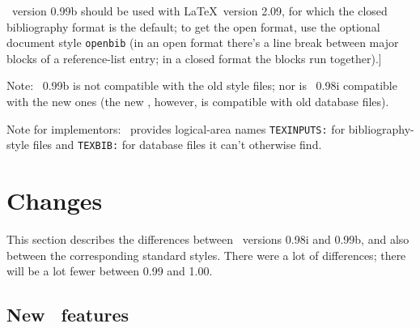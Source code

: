 \BibTeX\ version 0.99b should be used with \LaTeX\ version 2.09,
for which the closed bibliography format is the default;
to get the open format, use the optional document style {\tt openbib}
(in an open format there's a line break between major blocks of a
reference-list entry; in a closed format the blocks run together).]

Note: \BibTeX\ 0.99b is not compatible with the old style files;
nor is \BibTeX\ 0.98i compatible with the new ones
(the new \BibTeX, however, is compatible with old database files).

Note for implementors: \BibTeX\ provides logical-area names
\hbox{\tt TEXINPUTS:} for bibliography-style files and
\hbox{\tt TEXBIB:} for database files it can't otherwise find.


\section{Changes}
\label{differences}

This section describes the differences between
\BibTeX\ versions 0.98i and 0.99b, and also between
the corresponding standard styles.
There were a lot of differences;
there will be a lot fewer between 0.99 and 1.00.


\subsection{New \BibTeX\ features}
\label{features}

